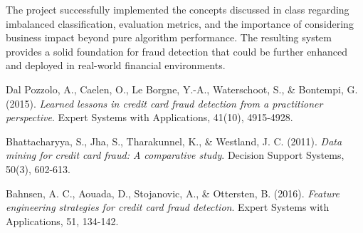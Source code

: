 \documentclass{article}
\begin{document}
The project successfully implemented the concepts discussed in class regarding imbalanced classification, evaluation metrics, and the importance of considering business impact beyond pure algorithm performance. The resulting system provides a solid foundation for fraud detection that could be further enhanced and deployed in real-world financial environments.


\begin{thebibliography}{9}

Dal Pozzolo, A., Caelen, O., Le Borgne, Y.-A., Waterschoot, S., \& Bontempi, G. (2015). 
\textit{Learned lessons in credit card fraud detection from a practitioner perspective}. 
Expert Systems with Applications, 41(10), 4915-4928.

Bhattacharyya, S., Jha, S., Tharakunnel, K., \& Westland, J. C. (2011). 
\textit{Data mining for credit card fraud: A comparative study}. 
Decision Support Systems, 50(3), 602-613.

Bahnsen, A. C., Aouada, D., Stojanovic, A., \& Ottersten, B. (2016). 
\textit{Feature engineering strategies for credit card fraud detection}. 
Expert Systems with Applications, 51, 134-142.

\end{thebibliography}
\end{document}
